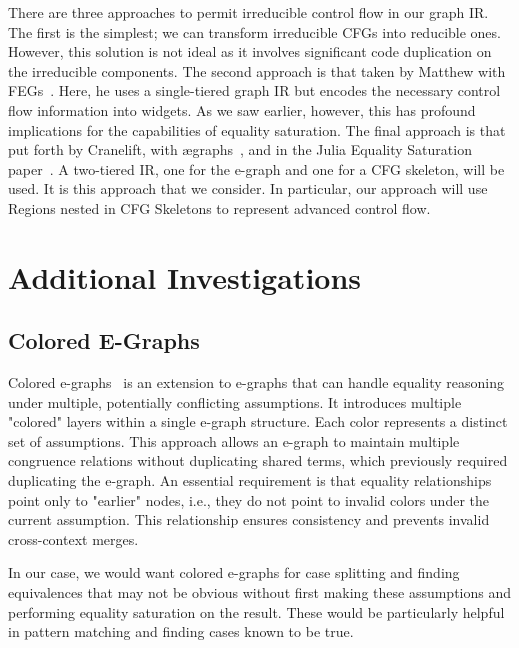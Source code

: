\documentclass{article}
\begin{document}
There are three approaches to permit irreducible control flow in our graph IR. The first is the simplest; we can transform irreducible CFGs into reducible ones. However, this solution is not ideal as it involves significant code duplication on the irreducible components. The second approach is that taken by Matthew with FEGs~\cite{dellaneve_2023}. Here, he uses a single-tiered graph IR but encodes the necessary control flow information into widgets. As we saw earlier, however, this has profound implications for the capabilities of equality saturation. The final approach is that put forth by Cranelift, with \ae graphs~\cite{AcyclicEgraphsSmart2024}, and in the Julia Equality Saturation paper~\cite{merckx2025equalitysaturationoptimizinghighlevel}. A two-tiered IR, one for the e-graph and one for a CFG skeleton, will be used. It is this approach that we consider. In particular, our approach will use Regions nested in CFG Skeletons to represent advanced control flow.



\section{Additional Investigations}

\subsection{Colored E-Graphs}

Colored e-graphs~\cite{singher2023coloredegraphequalityreasoning} is an extension to e-graphs that can handle equality reasoning under multiple, potentially conflicting assumptions. It introduces multiple "colored" layers within a single e-graph structure. Each color represents a distinct set of assumptions. This approach allows an e-graph to maintain multiple congruence relations without duplicating shared terms, which previously required duplicating the e-graph. An essential requirement is that equality relationships point only to "earlier" nodes, i.e., they do not point to invalid colors under the current assumption. This relationship ensures consistency and prevents invalid cross-context merges.

In our case, we would want colored e-graphs for case splitting and finding equivalences that may not be obvious without first making these assumptions and performing equality saturation on the result. These would be particularly helpful in pattern matching and finding cases known to be true.
\end{document}
